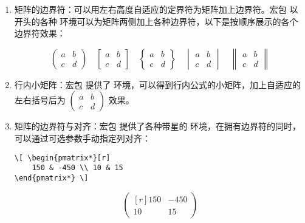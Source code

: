 \begin{enumerate}
\item 矩阵的边界符：可以用左右高度自适应的定界符为矩阵加上边界符。宏包  以  开头的各种  环境可以为矩阵两侧加上各种边界符，以下是按顺序展示的各个边界符效果：

\[ \begin{pmatrix} a&b\\c&d \end{pmatrix} \quad
   \begin{bmatrix} a&b\\c&d \end{bmatrix} \quad
   \begin{Bmatrix} a&b\\c&d \end{Bmatrix} \quad
   \begin{vmatrix} a&b\\c&d \end{vmatrix} \quad
   \begin{Vmatrix} a&b\\c&d \end{Vmatrix} \]

\item 行内小矩阵：宏包  提供了  环境，可以得到行内公式的小矩阵，加上自适应的左右括号后为 $\left(\begin{smallmatrix} a&b\\c&d \end{smallmatrix}\right)$ 效果。

\item 矩阵的边界符与对齐：宏包  提供了各种带星的  环境，在拥有边界符的同时，可以通过可选参数手动指定列对齐：

\begin{tcolorbox}[sidebyside]
\begin{lstlisting}
\[ \begin{pmatrix*}[r]
    150 & -450 \\ 10 & 15
\end{pmatrix*} \]
\end{lstlisting} 

\tcblower

\[ \begin{pmatrix*}[r]
    150 & -450 \\ 
     10 & 15
\end{pmatrix*} \]
\end{tcolorbox}


\end{enumerate}
